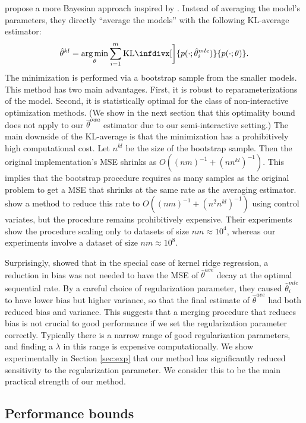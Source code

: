 \documentclass[twoside]{article}
\DeclareMathOperator*{\argmin}{arg\,min}
\newcommand{\w}{\theta}
\newcommand{\wkl}{\hat\w^{kl}}
\newcommand{\wowa}{\hat\w^{owa}}
\newcommand{\wave}{\hat\w^{ave}}
\newcommand{\wmle}{\hat\w^{mle}}
\newcommand{\kl}{\text{KL}\infdivx}
\begin{document}
\cite{liu2014distributed} propose a more Bayesian approach inspired by \cite{merugu2003privacy}.
Instead of averaging the model's parameters,
they directly ``average the models'' with the following KL-average estimator:
\begin{equation}
\wkl = \argmin_\w \sum_{i=1}^m \kl[\bigg]{p(\cdot;\wmle_i)}{p(\cdot;\w)}
.
\end{equation}
The minimization is performed via a bootstrap sample from the smaller models.
This method has two main advantages.
First, it is robust to reparameterizations of the model.
Second, it is statistically optimal for the class of non-interactive optimization methods.
(We show in the next section that this optimality bound does not apply to our $\wowa$ estimator due to our semi-interactive setting.)
The main downside of the KL-average is that the minimization has a prohibitively high computational cost.
Let $n^{kl}$ be the size of the bootstrap sample.
Then the original implementation's MSE shrinks as $O((nm)^{-1}+(nn^{kl})^{-1})$.
This implies that the bootstrap procedure requires as many samples as the original problem to get a MSE that shrinks at the same rate as the averaging estimator.
\cite{han2016bootstrap} show a method to reduce this rate to $O((nm)^{-1}+(n^2n^{kl})^{-1})$ using control variates, but the procedure remains prohibitively expensive.
Their experiments show the procedure scaling only to datasets of size $nm\approx10^4$,
whereas our experiments involve a dataset of size $nm\approx10^8$.

Surprisingly, \cite{zhang2013divide} showed that in the special case of kernel ridge regression,
a reduction in bias was not needed to have the MSE of $\wave$ decay at the optimal sequential rate.
By a careful choice of regularization parameter,
they caused $\wmle_i$ to have lower bias but higher variance,
so that the final estimate of $\wave$ had both reduced bias and variance.
This suggests that a merging procedure that reduces bias is not crucial to good performance if we set the regularization parameter correctly.
Typically there is a narrow range of good regularization parameters, and finding a $\lambda$ in this range is expensive computationally.
We show experimentally in Section \ref{sec:exp} that our method has significantly reduced sensitivity to the regularization parameter.
We consider this to be the main practical strength of our method.

\subsection{Performance bounds}
\label{sec:bounds}
\end{document}
